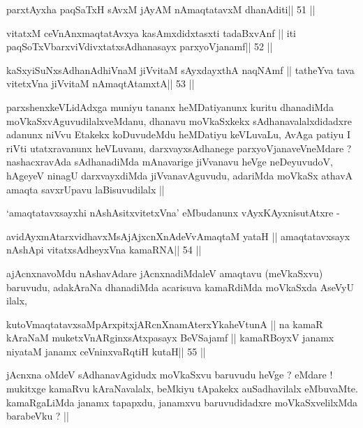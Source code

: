 \begin{shl}
parxtAyxha paqSaTxH sAvxM jAyAM nAmaqtatavxM dhanAditi\hfill || 51 ||
\end{shl}

\begin{shl}
vitatxM ceVnAnxmaqtatAvxya kasAmxdidxtasxti tadaBxvAnf ||
iti paqSoTxV\s barxviVdivxtatxsAdhanasayx parxyoVjanamf\hfill || 52 ||
\end{shl}

\begin{shl}
kaSxyiSuNxsAdhanAdhiVnaM jiVvitaM sAyxdayxthA naqNAmf ||
tatheYva tava vitetxVna jiVvitaM nAmaqtAtamxtA\hfill || 53 ||
\end{shl}

\begin{artha}
parxshenxkeVLidAdxga muniyu tananx heMDatiyanunx kuritu dhanadiMda
moVkaSxvAguvudilalxveMdanu, dhanavu moVkaSxkekx sAdhanavalalxdidadxre
adanunx niVvu Etakekx koDuvudeMdu heMDatiyu keVLuvaLu, AvAga patiyu I
riVti utatxravanunx heVLuvanu, darxvayxsAdhanege parxyoVjanaveVneMdare
? nashacxravAda sAdhanadiMda mAnavarige jiVvanavu heVge neDeyuvudoV,
hAgeyeV ninagU darxvayxdiMda jiVvanavAguvudu, adariMda moVkaSx athavA
amaqta savxrUpavu laBisuvudilalx ||

`amaqtatavxsayxhi nAshAsitxvitetxVna' eMbudanunx vAyxKAyxnisutAtxre -
\end{artha}

\begin{shl}
avidAyxmAtarxvidhavxMsAjAjxcnXnAdeVvAmaqtaM yataH ||
amaqtatavxsayx nA\s\s shA\s pi vitatxsAdheyxVna kamaRNA\hfill || 54 ||
\end{shl}

\begin{artha}
ajAcnxnavoMdu nAshavAdare jAcnxnadiMdaleV amaqtavu (meVkaSxvu)
baruvudu, adakAraNa dhanadiMda acarisuva kamaRdiMda moVkaSxda AseVyU ilalx,
\end{artha}

\begin{shl}
kutoV\s maqtatavxsaMpArxpitxjARcnXnamAterxYkaheVtunA ||
na kamaR kAraNaM muketxVnARginxsAtxpasayx BeVSajamf ||
kamaRBoyxV janamx niyataM janamx ceVninxvaRqtiH kutaH\hfill || 55 ||
\end{shl}

\begin{artha}
jAcnxna oMdeV sAdhanavAgidudx moVkaSxvu baruvudu heVge ? eMdare !
mukitxge kamaRvu kAraNavalalx, beMkiyu tApakekx auSadhavilalx
eMbuvaMte. kamaRgaLiMda janamx tapapxdu, janamxvu baruvudidadxre
moVkaSxvelilxMda barabeVku ? ||
\end{artha}

